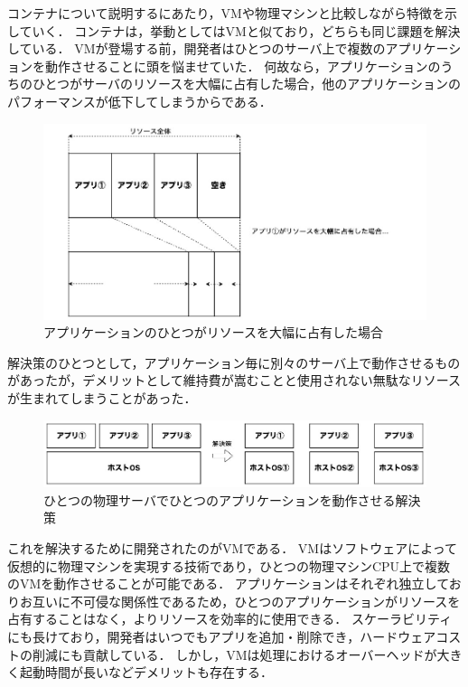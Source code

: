 コンテナについて説明するにあたり，VMや物理マシンと比較しながら特徴を示していく．
コンテナは，挙動としてはVMと似ており，どちらも同じ課題を解決している．
VMが登場する前，開発者はひとつのサーバ上で複数のアプリケーションを動作させることに頭を悩ませていた．
何故なら，アプリケーションのうちのひとつがサーバのリソースを大幅に占有した場合，他のアプリケーションのパフォーマンスが低下してしまうからである．

\begin{figure}[htbp]
\begin{center}
    \includegraphics[width=\textwidth]{./figures/resource-on-physical-server.jpg}
    \caption{アプリケーションのひとつがリソースを大幅に占有した場合}
\end{center}
\end{figure}

解決策のひとつとして，アプリケーション毎に別々のサーバ上で動作させるものがあったが，デメリットとして維持費が嵩むことと使用されない無駄なリソースが生まれてしまうことがあった．

\begin{figure}[htbp]
\begin{center}
    \includegraphics[width=\textwidth]{./figures/only-on-physical-server.jpg}
    \caption{ひとつの物理サーバでひとつのアプリケーションを動作させる解決策}
\end{center}
\end{figure}

これを解決するために開発されたのがVMである．
VMはソフトウェアによって仮想的に物理マシンを実現する技術であり，ひとつの物理マシンCPU上で複数のVMを動作させることが可能である．
アプリケーションはそれぞれ独立しておりお互いに不可侵な関係性であるため，ひとつのアプリケーションがリソースを占有することはなく，よりリソースを効率的に使用できる．
スケーラビリティにも長けており，開発者はいつでもアプリを追加・削除でき，ハードウェアコストの削減にも貢献している．
しかし，VMは処理におけるオーバーヘッドが大きく起動時間が長いなどデメリットも存在する．

